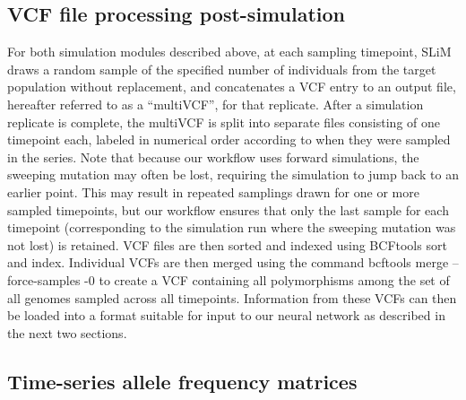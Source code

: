 \subsection{VCF file processing post-simulation}

For both simulation modules described above, at each sampling timepoint, SLiM draws a random sample of the specified number of individuals from the target population without replacement, and concatenates a VCF entry to an output file, hereafter referred to as a “multiVCF”, for that replicate. After a simulation replicate is complete, the multiVCF is split into separate files consisting of one timepoint each, labeled in numerical order according to when they were sampled in the series. Note that because our workflow uses forward simulations, the sweeping mutation may often be lost, requiring the simulation to jump back to an earlier point. This may result in repeated samplings drawn for one or more sampled timepoints, but our workflow ensures that only the last sample for each timepoint (corresponding to the simulation run where the sweeping mutation was not lost) is retained. VCF files are then sorted and indexed using BCFtools \cite{danecekTwelveYearsSAMtools2021,liStatisticalFrameworkSNP2011} sort and index. Individual VCFs are then merged using the command bcftools merge --force-samples -0 to create a VCF containing all polymorphisms among the set of all genomes sampled across all timepoints. Information from these VCFs can then be loaded into a format suitable for input to our neural network as described in the next two sections. \\

\subsection{Time-series allele frequency matrices}

